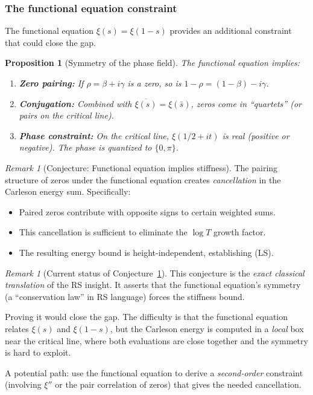 \documentclass[11pt]{article}
\newtheorem{proposition}[theorem]{Proposition}
\theoremstyle{definition}
\theoremstyle{remark}
\newtheorem{remark}[theorem]{Remark}
\theoremstyle{definition}
\begin{document}
\subsubsection*{The functional equation constraint}

The functional equation $\xi(s) = \xi(1-s)$ provides an additional constraint that could close the gap.

\begin{proposition}[Symmetry of the phase field]\label{prop:fe-symmetry}
The functional equation implies:
\begin{enumerate}
\item \textbf{Zero pairing:} If $\rho = \beta + i\gamma$ is a zero, so is $1 - \rho = (1-\beta) - i\gamma$.
\item \textbf{Conjugation:} Combined with $\overline{\xi(s)} = \xi(\bar{s})$, zeros come in ``quartets'' (or pairs on the critical line).
\item \textbf{Phase constraint:} On the critical line, $\xi(1/2+it)$ is \emph{real} (positive or negative). The phase is quantized to $\{0, \pi\}$.
\end{enumerate}
\end{proposition}

\begin{remark}[Conjecture: Functional equation implies stiffness]\label{conj:fe-stiffness}
The pairing structure of zeros under the functional equation creates \emph{cancellation} in the Carleson energy sum. Specifically:
\begin{itemize}
\item Paired zeros contribute with opposite signs to certain weighted sums.
\item This cancellation is sufficient to eliminate the $\log T$ growth factor.
\item The resulting energy bound is height-independent, establishing \textup{(LS)}.
\end{itemize}
\end{remark}

\begin{remark}[Current status of Conjecture~\ref{conj:fe-stiffness}]
This conjecture is the \emph{exact classical translation} of the RS insight. It asserts that the functional equation's symmetry (a ``conservation law'' in RS language) forces the stiffness bound.

Proving it would close the gap. The difficulty is that the functional equation relates $\xi(s)$ and $\xi(1-s)$, but the Carleson energy is computed in a \emph{local} box near the critical line, where both evaluations are close together and the symmetry is hard to exploit.

A potential path: use the functional equation to derive a \emph{second-order} constraint (involving $\xi''$ or the pair correlation of zeros) that gives the needed cancellation.
\end{remark}
\end{document}
